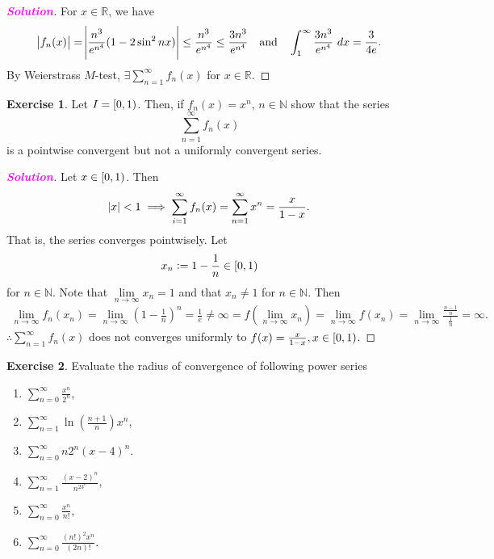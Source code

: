 \documentclass[12pt,openany]{book}
\theoremstyle{definition}
\newtheorem{exercise}{Exercise}[chapter]
\newcommand{\N}{\mathbb{N}}
\newcommand{\R}{\mathbb{R}}
\newcommand{\of}[1]{\left( #1 \right)}
\newcommand{\sol}{\textcolor{magenta}{\bf Solution}}
\begin{document}
	\begin{proof}[\sol]
		For $x\in\R$, we have \[
		\abs{f_n(x)}=\abs{\frac{n^3}{e^{n^4}}(1-2\sin^2nx)}\leq\frac{n^3}{e^{n^4}}\leq\frac{3n^3}{e^{n^4}}\quad\text{and}\quad \int_1^\infty\frac{3n^3}{e^{n^4}}\ dx=\frac{3}{4e}.
		\] By Weierstrass $M$-test, $\exists\sum_{n=1}^\infty f_n(x)$ for $x\in\R$.
	\end{proof}
	\begin{tcolorbox}[colframe=execolor, title={\color{white}\bf}]
		\begin{exercise}
			Let \( I = \intco{0,1} \). Then, if \( f_n(x) = x^n \), \( n \in \mathbb{N} \) show that the series
			\[ \sum_{n=1}^{\infty} f_n(x) \]
			is a pointwise convergent but not a uniformly convergent series.
		\end{exercise}
	\end{tcolorbox}
	\begin{proof}[\sol]
		Let $x\in\intco{0,1}$. Then \[
		\abs{x}<1\implies\sum_{i=1}^\infty f_n(x)=\sum_{n=1}^\infty x^n=\frac{x}{1-x}.
		\] That is, the series converges pointwisely. Let \[
		x_n:=1-\frac{1}{n}\in\intco{0,1}
		\] for $n\in\N$. Note that $\lim\limits_{n\to\infty}x_n=1$ and that $x_n\neq 1$ for $n\in\N$. Then
		\begin{align*}
			\lim\limits_{n\to\infty}f_n(x_n)=\lim\limits_{n\to\infty}\of{1-\frac{1}{n}}^n=\frac{1}{e}\neq\infty=f(\lim\limits_{n\to\infty}x_n)=\lim\limits_{n\to\infty}f(x_n)=\lim\limits_{n\to\infty}\frac{\frac{n-1}{n}}{\frac{1}{n}}=\infty.
		\end{align*} $\therefore\sum_{n=1}^\infty f_n(x)$ does not converges uniformly to $f(x)=\frac{x}{1-x}, x\in\intco{0,1}$.
	\end{proof}
	\begin{tcolorbox}[colframe=execolor, title={\color{white}\bf}]
		\begin{exercise}
			Evaluate the radius of convergence of following power series
			\begin{enumerate}
				\item \(\displaystyle\sum_{n=0}^{\infty} \frac{x^n}{2^n}\),
				\item \(\displaystyle\sum_{n=1}^{\infty} \ln \left( \frac{n+1}{n} \right) x^n\),
				\item \(\displaystyle\sum_{n=0}^{\infty} n2^n(x - 4)^n\).
				\item \(\displaystyle\sum_{n=1}^{\infty} \frac{(x-2)^n}{n^23^n}\),
				\item \(\displaystyle\sum_{n=0}^{\infty} \frac{x^n}{n!}\),
				\item \(\displaystyle\sum_{n=0}^{\infty} \frac{(n!)^2x^n}{(2n)!}\).
			\end{enumerate}
		\end{exercise}
	\end{tcolorbox}
\end{document}
